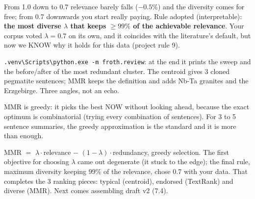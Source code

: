 \documentclass[11pt,a4paper]{article}
\begin{document}
From 1.0 down to 0.7 relevance barely falls ($-0.5\%$) and the diversity comes for free; from
0.7 downwards you start really paying. Rule adopted (interpretable): \textbf{the most diverse
$\lambda$ that keeps $\geq 99\%$ of the achievable relevance}. Your corpus voted $\lambda = 0.7$
on its own, and it coincides with the literature's default, but now we KNOW why it holds for
this data (project rule 9).

\begin{practica}
\texttt{.venv\textbackslash Scripts\textbackslash python.exe -m froth.review}: at the end it
prints the sweep and the before/after of the most redundant cluster. The centroid gives 3
cloned pegmatite sentences; MMR keeps the definition and adds Nb-Ta granites and the
Erzgebirge. Three angles, not an echo.
\end{practica}

\begin{ojo}
MMR is greedy: it picks the best NOW without looking ahead, because the exact optimum is
combinatorial (trying every combination of sentences). For 3 to 5 sentence summaries, the
greedy approximation is the standard and it is more than enough.
\end{ojo}

\begin{resumen}
MMR $=$ $\lambda \cdot$relevance $-$ $(1-\lambda) \cdot$redundancy, greedy selection. The first
objective for choosing $\lambda$ came out degenerate (it stuck to the edge); the final rule,
maximum diversity keeping 99\% of the relevance, chose 0.7 with your data. That completes the 3
ranking pieces: typical (centroid), endorsed (TextRank) and diverse (MMR). Next comes
assembling draft v2 (7.4).
\end{resumen}
\end{document}
